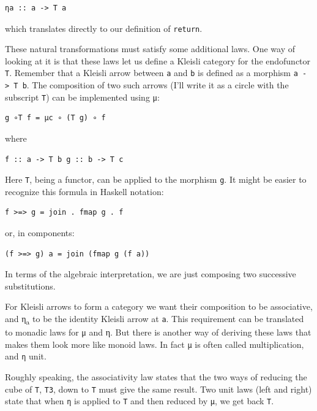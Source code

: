 \begin{verbatim}
ηa :: a -> T a
\end{verbatim}

which translates directly to our definition of \texttt{return}.

These natural transformations must satisfy some additional laws. One way
of looking at it is that these laws let us define a Kleisli category for
the endofunctor \texttt{T}. Remember that a Kleisli arrow between
\texttt{a} and \texttt{b} is defined as a morphism
\texttt{a\ -\textgreater{}\ T\ b}. The composition of two such arrows
(I'll write it as a circle with the subscript \texttt{T}) can be
implemented using μ:

\begin{verbatim}
g ∘T f = μc ∘ (T g) ∘ f
\end{verbatim}

where

\begin{verbatim}
f :: a -> T b g :: b -> T c
\end{verbatim}

Here \texttt{T}, being a functor, can be applied to the morphism
\texttt{g}. It might be easier to recognize this formula in Haskell
notation:

\begin{verbatim}
f >=> g = join . fmap g . f
\end{verbatim}

or, in components:

\begin{verbatim}
(f >=> g) a = join (fmap g (f a))
\end{verbatim}

In terms of the algebraic interpretation, we are just composing two
successive substitutions.

For Kleisli arrows to form a category we want their composition to be
associative, and η\textsubscript{a} to be the identity Kleisli arrow at
\texttt{a}. This requirement can be translated to monadic laws for μ and
η. But there is another way of deriving these laws that makes them look
more like monoid laws. In fact \texttt{μ} is often called
multiplication, and \texttt{η} unit.

Roughly speaking, the associativity law states that the two ways of
reducing the cube of \texttt{T}, \texttt{T3}, down to \texttt{T} must
give the same result. Two unit laws (left and right) state that when
\texttt{η} is applied to \texttt{T} and then reduced by \texttt{μ}, we
get back \texttt{T}.

